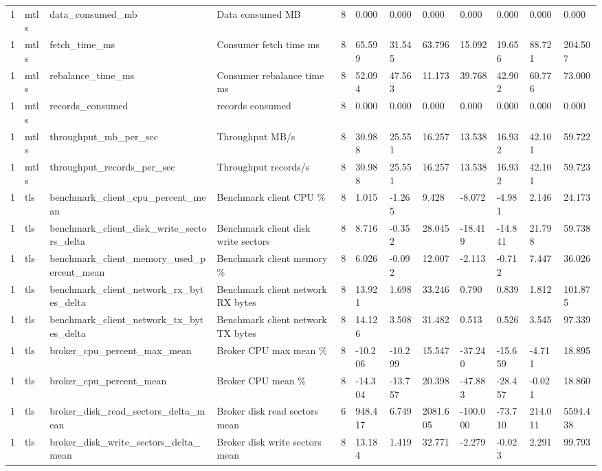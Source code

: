 \begin{longtable}{llllllllllll}
1 & mtls & data\_consumed\_mb & Data consumed MB & 8 & 0.000 & 0.000 & 0.000 & 0.000 & 0.000 & 0.000 & 0.000 \\
1 & mtls & fetch\_time\_ms & Consumer fetch time ms & 8 & 65.599 & 31.545 & 63.796 & 15.092 & 19.656 & 88.721 & 204.507 \\
1 & mtls & rebalance\_time\_ms & Consumer rebalance time ms & 8 & 52.094 & 47.563 & 11.173 & 39.768 & 42.902 & 60.776 & 73.000 \\
1 & mtls & records\_consumed & records consumed & 8 & 0.000 & 0.000 & 0.000 & 0.000 & 0.000 & 0.000 & 0.000 \\
1 & mtls & throughput\_mb\_per\_sec & Throughput MB/s & 8 & 30.988 & 25.551 & 16.257 & 13.538 & 16.932 & 42.101 & 59.722 \\
1 & mtls & throughput\_records\_per\_sec & Throughput records/s & 8 & 30.988 & 25.551 & 16.257 & 13.538 & 16.932 & 42.101 & 59.723 \\
1 & tls & benchmark\_client\_cpu\_percent\_mean & Benchmark client CPU \% & 8 & 1.015 & -1.265 & 9.428 & -8.072 & -4.981 & 2.146 & 24.173 \\
1 & tls & benchmark\_client\_disk\_write\_sectors\_delta & Benchmark client disk write sectors & 8 & 8.716 & -0.352 & 28.045 & -18.419 & -14.841 & 21.798 & 59.738 \\
1 & tls & benchmark\_client\_memory\_used\_percent\_mean & Benchmark client memory \% & 8 & 6.026 & -0.092 & 12.007 & -2.113 & -0.712 & 7.447 & 36.026 \\
1 & tls & benchmark\_client\_network\_rx\_bytes\_delta & Benchmark client network RX bytes & 8 & 13.921 & 1.698 & 33.246 & 0.790 & 0.839 & 1.812 & 101.875 \\
1 & tls & benchmark\_client\_network\_tx\_bytes\_delta & Benchmark client network TX bytes & 8 & 14.126 & 3.508 & 31.482 & 0.513 & 0.526 & 3.545 & 97.339 \\
1 & tls & broker\_cpu\_percent\_max\_mean & Broker CPU max mean \% & 8 & -10.206 & -10.299 & 15.547 & -37.240 & -15.659 & -4.711 & 18.895 \\
1 & tls & broker\_cpu\_percent\_mean & Broker CPU mean \% & 8 & -14.304 & -13.757 & 20.398 & -47.883 & -28.457 & -0.021 & 18.860 \\
1 & tls & broker\_disk\_read\_sectors\_delta\_mean & Broker disk read sectors mean & 6 & 948.417 & 6.749 & 2081.605 & -100.000 & -73.710 & 214.011 & 5594.438 \\
1 & tls & broker\_disk\_write\_sectors\_delta\_mean & Broker disk write sectors mean & 8 & 13.184 & 1.419 & 32.771 & -2.279 & -0.023 & 2.291 & 99.793 \\

\end{longtable}
